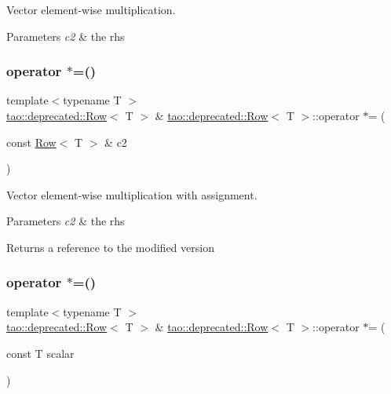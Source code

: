 Vector element-\/wise multiplication. 


\begin{DoxyParams}{Parameters}
{\em c2} & the rhs \\
\hline
\end{DoxyParams}
\mbox{\label{classtao_1_1deprecated_1_1_row_aa4180f95e280e3dae3153230169f264f}} 
\subsubsection{\texorpdfstring{operator $\ast$=()}{operator *=()}\hspace{0.1cm}{\footnotesize\ttfamily [1/2]}}
{\footnotesize\ttfamily template$<$typename T $>$ \\
\mbox{\hyperlink{classtao_1_1deprecated_1_1_row}{tao\+::deprecated\+::\+Row}}$<$ T $>$ \& \mbox{\hyperlink{classtao_1_1deprecated_1_1_row}{tao\+::deprecated\+::\+Row}}$<$ T $>$\+::operator $\ast$= (\begin{DoxyParamCaption}\item[{const \mbox{\hyperlink{classtao_1_1deprecated_1_1_row}{Row}}$<$ T $>$ \&}]{c2 }\end{DoxyParamCaption})}



Vector element-\/wise multiplication with assignment. 


\begin{DoxyParams}{Parameters}
{\em c2} & the rhs \\
\hline
\end{DoxyParams}
\begin{DoxyReturn}{Returns}
a reference to the modified version 
\end{DoxyReturn}
\mbox{\label{classtao_1_1deprecated_1_1_row_accb9ab32b02613712940160b7b96502f}} 
\subsubsection{\texorpdfstring{operator $\ast$=()}{operator *=()}\hspace{0.1cm}{\footnotesize\ttfamily [2/2]}}
{\footnotesize\ttfamily template$<$typename T $>$ \\
\mbox{\hyperlink{classtao_1_1deprecated_1_1_row}{tao\+::deprecated\+::\+Row}}$<$ T $>$ \& \mbox{\hyperlink{classtao_1_1deprecated_1_1_row}{tao\+::deprecated\+::\+Row}}$<$ T $>$\+::operator $\ast$= (\begin{DoxyParamCaption}\item[{const T}]{scalar }\end{DoxyParamCaption})}



